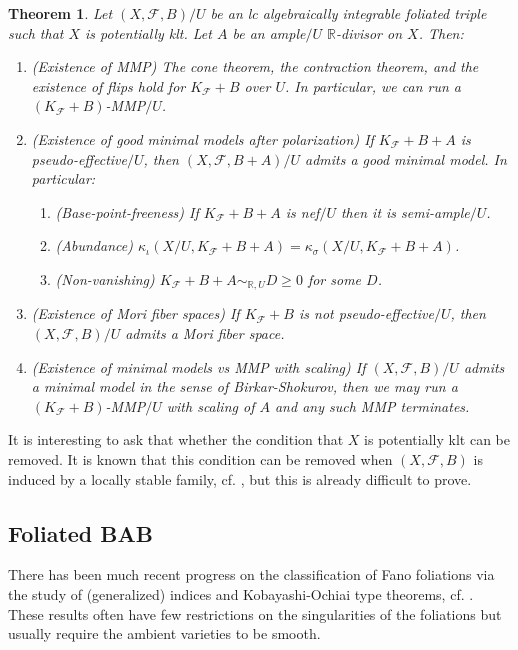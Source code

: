 \documentclass[12pt]{amsart}
\numberwithin{equation}{section}
\newcommand{\Rr}{\mathbb{R}}
\newcommand{\Ff}{\mathcal{F}}
\newtheorem{thmsub}{Theorem}[subsection]
\theoremstyle{definition}
\theoremstyle{definition}
\theoremstyle{definition}
\begin{document}
\begin{thmsub}\label{thm: mmp ai potentially klt ambient variety}
Let $(X,\Ff,B)/U$ be an lc algebraically integrable foliated triple such that $X$ is potentially klt. Let $A$ be an ample$/U$ $\Rr$-divisor on $X$. Then: 
\begin{enumerate}
    \item (Existence of MMP) The cone theorem, the contraction theorem, and the existence of flips hold for $K_{\Ff}+B$ over $U$. In particular, we can run a $(K_{\Ff}+B)$-MMP$/U$.
    \item (Existence of good minimal models after polarization) If $K_{\Ff}+B+A$ is pseudo-effective$/U$, then $(X,\Ff,B+A)/U$ admits a good minimal model. In particular:
    \begin{enumerate}
        \item (Base-point-freeness) If $K_{\Ff}+B+A$ is nef$/U$ then it is semi-ample$/U$.
        \item (Abundance) $\kappa_{\iota}(X/U,K_{\Ff}+B+A)=\kappa_{\sigma}(X/U,K_{\Ff}+B+A)$.
        \item (Non-vanishing) $K_{\Ff}+B+A\sim_{\mathbb R,U}D\geq 0$ for some $D$.
    \end{enumerate}
    \item (Existence of Mori fiber spaces) If $K_{\Ff}+B$ is not pseudo-effective$/U$, then $(X,\Ff,B)/U$ admits a Mori fiber space.
    \item (Existence of minimal models vs MMP with scaling) If $(X,\Ff,B)/U$ admits a minimal model in the sense of Birkar-Shokurov, then we may run a $(K_{\Ff}+B)$-MMP$/U$ with scaling of $A$ and any such MMP terminates.
\end{enumerate}
\end{thmsub}

It is interesting to ask that whether the condition that $X$ is potentially klt can be removed. It is known that this condition can be removed when $(X,\Ff,B)$ is induced by a locally stable family, cf. \cite{MZ23}, but this is already difficult to prove.




\subsection{Foliated BAB}
\label{s_fbab}

There has been much recent progress on the classification of Fano foliations via the study of (generalized) indices and Kobayashi-Ochiai type theorems, cf. \cite{ADK08,AD13,AD14,Hör14,AD19,Liu23}. These results often have few restrictions on the singularities of the foliations but usually require the ambient varieties to be smooth. 
\end{document}
